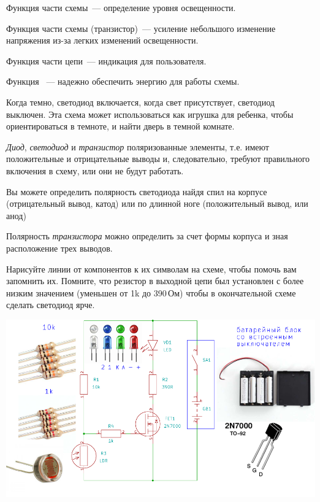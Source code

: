 
Функция  части схемы\ --- определение уровня освещенности.

Функция  части схемы (транзистор)\ --- усиление
небольшого изменение напряжения из-за легких изменений освещенности.

Функция  части цепи\ --- индикация для пользователя.

Функция \ --- надежно обеспечить энергию для работы
схемы.

\bigskip 
Когда темно, светодиод включается, когда свет присутствует, светодиод выключен.
Эта схема может использоваться как игрушка для ребенка, чтобы ориентироваться в
темноте, и найти дверь в темной комнате.

\emph{Диод}, \emph{светодиод} и \emph{транзистор} поляризованные элементы, т.е.
имеют положительные и отрицательные выводы и, следовательно, требуют правильного
включения в схему, или они не будут работать.

\bigskip
Вы можете определить полярность светодиода найдя спил на корпусе (отрицательный
вывод, катод) или по длинной ноге (положительный вывод, или анод)

Полярность \emph{транзистора} можно определить за счет формы корпуса и зная
расположение трех выводов.

\bigskip Нарисуйте линии от компонентов к их символам на схеме, чтобы помочь вам
запомнить их. Помните, что резистор в выходной цепи был установлен с более
низким значением (уменьшен от 1k до 390\,Ом) чтобы в окончательной схеме сделать
светодиод ярче.

\bigskip\noindent
\includegraphics[width=\textwidth]{bcollis/ldr/final.pdf}
